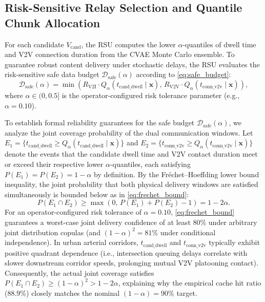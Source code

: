 \documentclass[journal]{IEEEtran}
\begin{document}
\subsection{Risk-Sensitive Relay Selection and Quantile Chunk Allocation}
For each candidate $V_{\text{cand}}$, the RSU computes the lower $\alpha$-quantiles of dwell time and V2V connection duration from the CVAE Monte Carlo ensemble. To guarantee robust content delivery under stochastic delays, the RSU evaluates the risk-sensitive safe data budget $\mathcal{D}_{\text{safe}}(\alpha)$ according to \eqref{eq:safe_budget}:
\begin{equation}
\mathcal{D}_{\text{safe}}(\alpha) = \min\left( R_{\text{V2I}} \cdot Q_\alpha(t_{\text{cand\_dwell}} \mid \mathbf{x}), \, R_{\text{V2V}} \cdot Q_\alpha(t_{\text{conn\_v2v}} \mid \mathbf{x}) \right),
\label{eq:safe_budget}
\end{equation}
where $\alpha \in (0, 0.5]$ is the operator-configured risk tolerance parameter (e.g., $\alpha = 0.10$). 

To establish formal reliability guarantees for the safe budget $\mathcal{D}_{\text{safe}}(\alpha)$, we analyze the joint coverage probability of the dual communication windows. Let $E_1 = \{ t_{\text{cand\_dwell}} \ge Q_\alpha(t_{\text{cand\_dwell}} \mid \mathbf{x}) \}$ and $E_2 = \{ t_{\text{conn\_v2v}} \ge Q_\alpha(t_{\text{conn\_v2v}} \mid \mathbf{x}) \}$ denote the events that the candidate dwell time and V2V contact duration meet or exceed their respective lower $\alpha$-quantiles, each satisfying $P(E_1) = P(E_2) = 1 - \alpha$ by definition. By the Fr\'echet--Hoeffding lower bound inequality, the joint probability that both physical delivery windows are satisfied simultaneously is bounded below as in \eqref{eq:frechet_bound}:
\begin{equation}
P(E_1 \cap E_2) \ge \max\left(0, \, P(E_1) + P(E_2) - 1\right) = 1 - 2\alpha.
\label{eq:frechet_bound}
\end{equation}
For an operator-configured risk tolerance of $\alpha = 0.10$, \eqref{eq:frechet_bound} guarantees a worst-case joint delivery confidence of at least $80\%$ under arbitrary joint distribution copulas (and $(1-\alpha)^2 = 81\%$ under conditional independence). In urban arterial corridors, $t_{\text{cand\_dwell}}$ and $t_{\text{conn\_v2v}}$ typically exhibit positive quadrant dependence (i.e., intersection queuing delays correlate with slower downstream corridor speeds, prolonging mutual V2V platooning contact). Consequently, the actual joint coverage satisfies $P(E_1 \cap E_2) \ge (1-\alpha)^2 > 1 - 2\alpha$, explaining why the empirical cache hit ratio ($88.9\%$) closely matches the nominal $(1-\alpha) = 90\%$ target.
\end{document}
